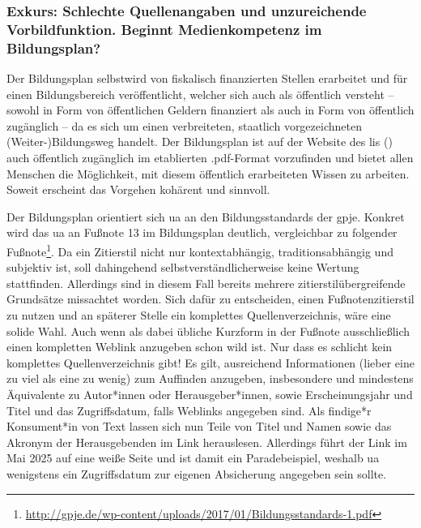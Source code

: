 \subsubsection{Exkurs: Schlechte Quellenangaben und unzureichende Vorbildfunktion. Beginnt Medienkompetenz im Bildungsplan? \label{gpje}}
Der Bildungsplan selbstwird von fiskalisch finanzierten Stellen erarbeitet und für einen Bildungsbereich veröffentlicht, welcher sich auch als öffentlich versteht -- sowohl in Form von öffentlichen Geldern finanziert als auch in Form von öffentlich zugänglich -- da es sich um einen verbreiteten, staatlich vorgezeichneten \mbox{(Weiter-)Bildungsweg} %
handelt. Der Bildungsplan ist auf der Website des \gls{lis} (\citeyear[]{LisBildungspläne}) auch öffentlich zugänglich im etablierten .pdf-Format vorzufinden und bietet allen Menschen die Möglichkeit, mit diesem öffentlich erarbeiteten Wissen zu arbeiten.
Soweit erscheint das Vorgehen kohärent und sinnvoll.

Der Bildungsplan orientiert sich \gls{ua} an den Bildungsstandards der \gls{gpje}. Konkret wird das \gls{ua} an Fußnote 13 im Bildungsplan \autocite[][9]{bplan} deutlich, vergleichbar zu folgender Fußnote\footnote{\url{http://gpje.de/wp-content/uploads/2017/01/Bildungsstandards-1.pdf}}. Da ein Zitierstil nicht nur kontextabhängig, traditionsabhängig und subjektiv ist, soll dahingehend selbstverständlicherweise keine Wertung stattfinden. Allerdings sind in diesem Fall bereits mehrere zitierstilübergreifende Grundsätze missachtet worden. Sich dafür zu entscheiden, einen Fußnotenzitierstil zu nutzen und an späterer Stelle ein komplettes Quellenverzeichnis, wäre eine solide Wahl. Auch wenn als dabei übliche Kurzform in der Fußnote ausschließlich einen kompletten Weblink anzugeben schon wild ist. Nur dass es schlicht kein komplettes Quellenverzeichnis gibt!  
Es gilt, ausreichend Informationen (lieber eine zu viel als eine zu wenig) zum Auffinden anzugeben, insbesondere und mindestens Äquivalente zu Autor*innen oder Herausgeber*innen, sowie Erscheinungsjahr und Titel und das Zugriffsdatum, falls Weblinks angegeben sind. 
Als findige*r Konsument*in von Text lassen sich nun Teile von Titel und Namen sowie das Akronym der Herausgebenden im Link herauslesen. Allerdings führt der Link im Mai 2025 auf eine weiße Seite und ist damit ein Paradebeispiel, weshalb \gls{ua} wenigstens ein Zugriffsdatum zur eigenen Absicherung angegeben sein sollte.

